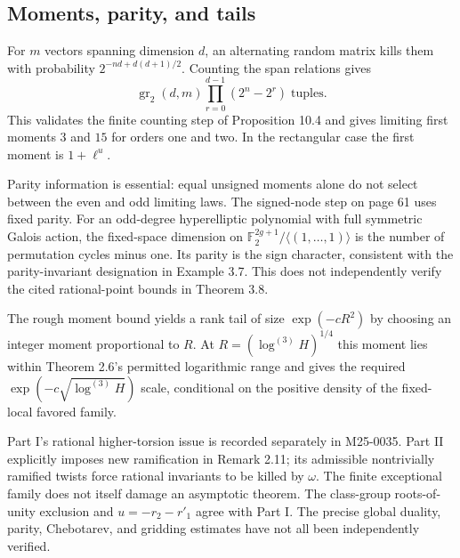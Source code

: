 \documentclass[10pt]{article}
\begin{document}
\subsection*{Moments, parity, and tails}
For \(m\) vectors spanning dimension \(d\), an alternating random matrix kills them with probability \(2^{-nd+d(d+1)/2}\). Counting the span relations gives \[\operatorname{gr}_2(d,m)\prod_{r=0}^{d-1}(2^n-2^r)\;\text{tuples}.\] This validates the finite counting step of Proposition 10.4 and gives limiting first moments \(3\) and \(15\) for orders one and two. In the rectangular case the first moment is \(1+\ell^u\).\par
Parity information is essential: equal unsigned moments alone do not select between the even and odd limiting laws. The signed-node step on page 61 uses fixed parity. For an odd-degree hyperelliptic polynomial with full symmetric Galois action, the fixed-space dimension on \(\mathbb F_2^{2g+1}/\langle(1,\ldots,1)\rangle\) is the number of permutation cycles minus one. Its parity is the sign character, consistent with the parity-invariant designation in Example 3.7. This does not independently verify the cited rational-point bounds in Theorem 3.8.\par
The rough moment bound yields a rank tail of size \(\exp(-cR^2)\) by choosing an integer moment proportional to \(R\). At \(R=(\log^{(3)}H)^{1/4}\) this moment lies within Theorem 2.6’s permitted logarithmic range and gives the required \(\exp(-c\sqrt{\log^{(3)}H})\) scale, conditional on the positive density of the fixed-local favored family.\par
Part I’s rational higher-torsion issue is recorded separately in M25-0035. Part II explicitly imposes new ramification in Remark 2.11; its admissible nontrivially ramified twists force rational invariants to be killed by \(\omega\). The finite exceptional family does not itself damage an asymptotic theorem. The class-group roots-of-unity exclusion and \(u=-r_2-r'_1\) agree with Part I. The precise global duality, parity, Chebotarev, and gridding estimates have not all been independently verified.\par
\end{document}
